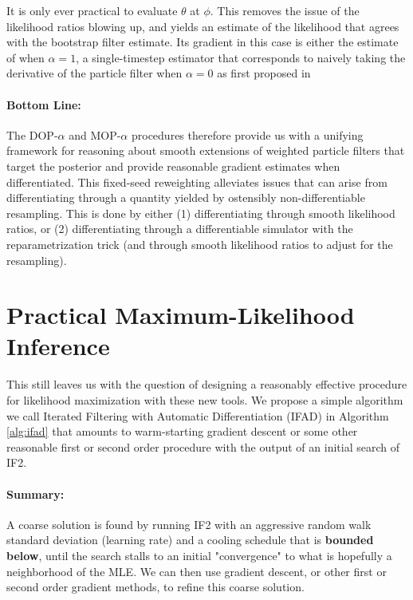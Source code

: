 \documentclass{article}
\begin{document}
It is only ever practical to evaluate $\theta$ at $\phi$. This removes the issue of the likelihood ratios blowing up, and yields an estimate of the likelihood that agrees with the bootstrap filter estimate. Its gradient in this case is either the estimate of \citet{doucet2011sf} when $\alpha=1$, a single-timestep estimator that corresponds to naively taking the derivative of the particle filter when $\alpha=0$ as first proposed in \citet{blei2018vsmc}

\paragraph{Bottom Line:} The DOP-$\alpha$ and MOP-$\alpha$ procedures therefore provide us with a unifying framework for reasoning about smooth extensions of weighted particle filters that target the posterior and provide reasonable gradient estimates when differentiated. This fixed-seed reweighting alleviates issues that can arise from differentiating through a quantity yielded by ostensibly non-differentiable resampling. This is done by either (1) differentiating through smooth likelihood ratios, or (2) differentiating through a differentiable simulator with the reparametrization trick (and through smooth likelihood ratios to adjust for the resampling). 


\section{Practical Maximum-Likelihood Inference}


This still leaves us with the question of designing a reasonably effective procedure for likelihood maximization with these new tools. We propose a simple algorithm we call Iterated Filtering with Automatic Differentiation (IFAD) in Algorithm \ref{alg:ifad} that amounts to warm-starting gradient descent or some other reasonable first or second order procedure with the output of an initial search of IF2. 

\paragraph{Summary:} A coarse solution is found by running IF2 with an aggressive random walk standard deviation (learning rate) and a cooling schedule that is \textbf{bounded below}, until the search stalls to an initial "convergence" to what is hopefully a neighborhood of the MLE. We can then use gradient descent, or other first or second order gradient methods, to refine this coarse solution.
\end{document}

